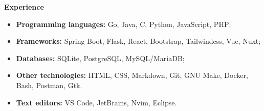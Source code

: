 {\vspace{0.5cm} \hspace{-0.5cm} \Large \textbf{Experience}}

\begin{itemize}
    \item \textbf{Programming languages:} Go, Java, C, Python, JavaScript, PHP;
    \item \textbf{Frameworks:} Spring Boot, Flask, React, Bootstrap, Tailwindcss, Vue, Nuxt;
    \item \textbf{Databases:} SQLite, PostgreSQL, MySQL/MariaDB;
    \item \textbf{Other technologies:} HTML, CSS, Markdown, Git, GNU Make, Docker, Bash, Postman, Gtk.
    \item \textbf{Text editors:} VS Code, JetBrains, Nvim, Eclipse.
\end{itemize}